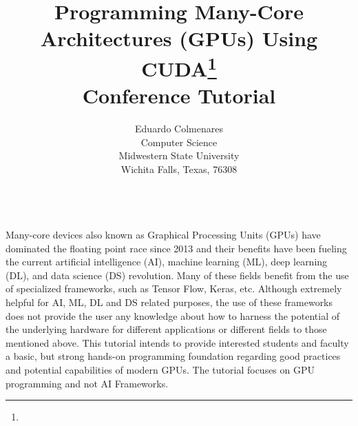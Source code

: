 \documentclass{article}
\title{Programming Many-Core Architectures (GPUs) Using CUDA\footnote{\protect}
\\
\vspace{0.2in}
\large{
Conference Tutorial
}}
\author{
Eduardo Colmenares\\
Computer Science\\
Midwestern State University\\
Wichita Falls, Texas, 76308\\
\email{eduardo.colmenares@msutexas.edu}\\
}
\begin{document}
\maketitle

\noindent Many-core devices also known as Graphical Processing Units (GPUs) have dominated the floating point race since 2013 and their benefits have been fueling the current artificial intelligence (AI), machine learning (ML), deep learning (DL), and data science (DS) revolution. Many of these fields benefit from the use of specialized frameworks, such as Tensor Flow, Keras, etc. Although extremely helpful for AI, ML, DL and DS related purposes, the use of these frameworks does not provide the user any knowledge about how to harness the potential of the underlying hardware for different applications or different fields to those mentioned above.
This tutorial intends to provide interested students and faculty a basic, but strong hands-on programming foundation regarding good practices and potential capabilities of modern GPUs. The tutorial focuses on GPU programming and not AI Frameworks.

\end{document}
